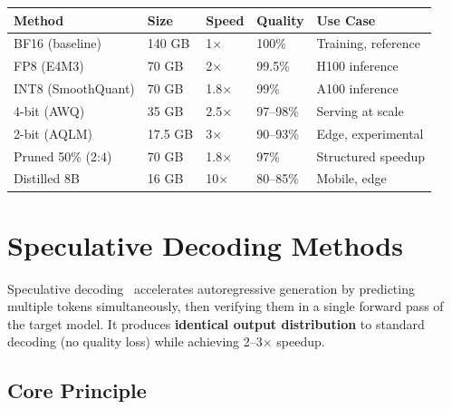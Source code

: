 \begin{examplebox}
\begin{tabular}{@{}lp{2.5cm}p{2.8cm}p{2.8cm}p{2.8cm}@{}}
\toprule
\textbf{Method} & \textbf{Size} & \textbf{Speed} & \textbf{Quality} & \textbf{Use Case} \\
\midrule
BF16 (baseline) & 140 GB & 1$\times$ & 100\% & Training, reference \\
FP8 (E4M3) & 70 GB & 2$\times$ & 99.5\% & H100 inference \\
INT8 (SmoothQuant) & 70 GB & 1.8$\times$ & 99\% & A100 inference \\
4-bit (AWQ) & 35 GB & 2.5$\times$ & 97--98\% & Serving at scale \\
2-bit (AQLM) & 17.5 GB & 3$\times$ & 90--93\% & Edge, experimental \\
Pruned 50\% (2:4) & 70 GB & 1.8$\times$ & 97\% & Structured speedup \\
Distilled 8B & 16 GB & 10$\times$ & 80--85\% & Mobile, edge \\
\bottomrule
\end{tabular}
\end{examplebox}

\section{Speculative Decoding Methods}
\label{speculative-decoding-methods}

Speculative decoding~\cite{leviathan2023fast} accelerates autoregressive generation by predicting multiple tokens simultaneously, then verifying them in a single forward pass of the target model. It produces \textbf{identical output distribution} to standard decoding (no quality loss) while achieving 2--3$\times$ speedup.

\subsection{Core Principle}
\label{core-principle}

